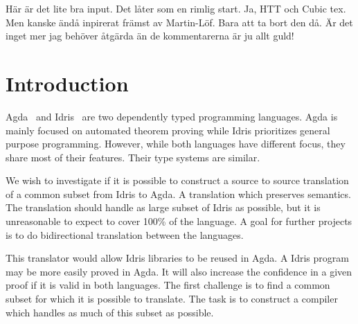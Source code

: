 \documentclass[parskip=half]{scrartcl}
\begin{document}
%
Här är det lite bra input. Det låter som en rimlig start.
%
Ja, HTT och Cubic tex. Men kanske ändå inpirerat främst av Martin-Löf.
%
Bara att ta bort den då.
%
Är det inget mer jag behöver åtgärda än de kommentarerna är ju allt guld!



\section{Introduction}

Agda~\cite{agda} and Idris~\cite{idris} are two dependently typed programming
languages.  Agda is mainly focused on automated theorem proving while Idris
prioritizes general purpose programming.  However, while both languages have
different focus, they share most of their features. Their type systems are
similar.



We wish to investigate if it is possible to construct a source to source
translation of a common subset from Idris to Agda. A translation which
preserves semantics. The translation should handle as large subset of Idris as
possible, but it is unreasonable to expect to cover 100\% of the language.
A goal for further projects is to do bidirectional translation between the
languages.

This translator would allow Idris libraries to be reused in Agda. A Idris
program may be more easily proved in Agda.  It will also increase the
confidence in a given proof if it is valid in both languages.  The first
challenge is to find a common subset for which it is possible to translate. The
task is to construct a compiler which handles as much of this subset as
possible.
\end{document}
